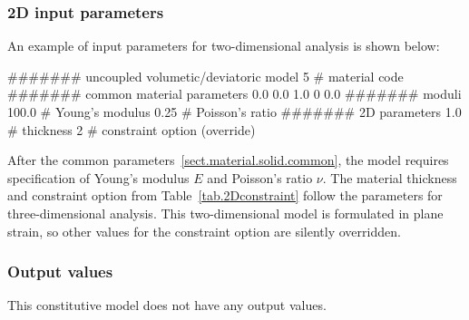\subsubsection{2D input parameters}
An example of input parameters for two-dimensional analysis is shown 
below:
\begin{inputfile}
####### uncoupled volumetic/deviatoric model
5     # material code
####### common material parameters
0.0    0.0    1.0
0      0.0
####### moduli
100.0 # Young's modulus
0.25  # Poisson's ratio
####### 2D parameters
1.0   # thickness
2     # constraint option (override)
\end{inputfile}
After the common parameters~\ref{sect.material.solid.common}, the 
model requires specification of Young's modulus $E$ and Poisson's 
ratio $\nu$. The material thickness and 
constraint option from Table~\ref{tab.2Dconstraint} 
follow the parameters for three-dimensional analysis.
This two-dimensional model is formulated in plane strain,
so other values for the constraint option are silently
overridden.

\subsubsection{Output values}
This constitutive model does not have any output values.

